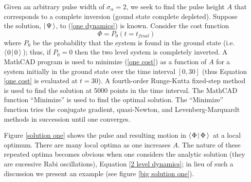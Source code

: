 Given an arbitrary pulse width of $\sigma_{\alpha}=2$, we seek to find the pulse height $A$ that corresponds to a complete inversion (gound state complete depleted). Suppose the solution, $\left| \hspace{0.15em} \Psi \hspace{0.15em}\right\rangle$, to (\ref{one dynamics}) is known. Consider the cost function
\begin{equation}
\Phi
=
P_0(t=t_{final})
\label{one cost}
\end{equation}
where $P_0$ be the probability that the system is found in the ground state (i.e. $\left\langle \hspace{0.10em} 0 \hspace{0.10em} \right| 0 \left\rangle \right.$); thus, if $P_0=0$ then the two level system is completely inverted.
A MathCAD program is used to minimize (\ref{one cost}) as a function of $A$ for a system initially in the ground state over the time interval $[0,30]$ (thus Equation \ref{one cost} is evaluated at $t=30$). A fourth-order Runge-Kutta fixed-step method is used to find the solution at 5000 points in the time interval. The MathCAD function ``Minimize'' is used to find the optimal solution. The ``Minimize'' function tries the conjugate gradient, quasi-Newton, and Levenberg-Marquardt methods in succession until one converges.

Figure \ref{solution one} shows the pulse and resulting motion in $\left\langle \hspace{0.10em} \Phi \hspace{0.10em} \right| \Phi \left\rangle \right.$ at a local optimum. There are many local optima as one increases $A$. The nature of these repeated optima becomes obvious when one considers the analytic solution (they are sucessive Rabi oscillations), Equation \ref{2 level dynamics}; in lieu of such a discussion we present an example (see figure \ref{big solution one}).


